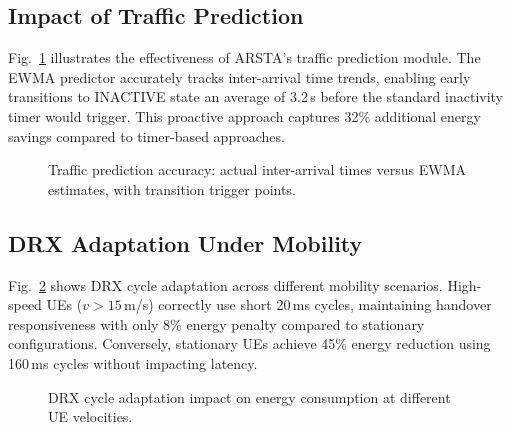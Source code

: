 \documentclass[conference]{IEEEtran}
\begin{document}
\subsection{Impact of Traffic Prediction}
\label{subsec:traffic_results}

Fig.~\ref{fig:traffic_prediction} illustrates the effectiveness of ARSTA's traffic prediction module. The EWMA predictor accurately tracks inter-arrival time trends, enabling early transitions to INACTIVE state an average of 3.2\,s before the standard inactivity timer would trigger. This proactive approach captures 32\% additional energy savings compared to timer-based approaches.

\begin{figure}[t]
    \centering
    \caption{Traffic prediction accuracy: actual inter-arrival times versus EWMA estimates, with transition trigger points.}
    \label{fig:traffic_prediction}
\end{figure}

\subsection{DRX Adaptation Under Mobility}
\label{subsec:drx_results}

Fig.~\ref{fig:drx_mobility} shows DRX cycle adaptation across different mobility scenarios. High-speed UEs ($v > 15$\,m/s) correctly use short 20\,ms cycles, maintaining handover responsiveness with only 8\% energy penalty compared to stationary configurations. Conversely, stationary UEs achieve 45\% energy reduction using 160\,ms cycles without impacting latency.

\begin{figure}[t]
    \centering
    \caption{DRX cycle adaptation impact on energy consumption at different UE velocities.}
    \label{fig:drx_mobility}
\end{figure}
\end{document}
